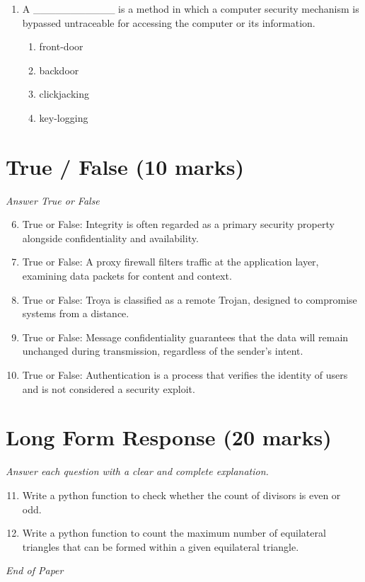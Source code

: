 \documentclass[12pt]{article}
\begin{document}
\begin{enumerate}[label=\arabic*.]
\begin{enumerate}[label=(\alph*)]
    \item Clickjacking
\end{enumerate}
\item A \_\_\_\_\_\_\_\_\_\_\_ is a method in which a computer security mechanism is bypassed untraceable for accessing the computer or its information.
\begin{enumerate}[label=(\alph*)]
    \item front-door
    \item backdoor
    \item clickjacking
    \item key-logging
\end{enumerate}
\end{enumerate}

\section*{True / False (10 marks)}
\textit{Answer True or False}
\begin{enumerate}[label=\arabic*.]
\setcounter{enumi}{5}
\item True or False: Integrity is often regarded as a primary security property alongside confidentiality and availability.
\item True or False: A proxy firewall filters traffic at the application layer, examining data packets for content and context.
\item True or False: Troya is classified as a remote Trojan, designed to compromise systems from a distance.
\item True or False: Message confidentiality guarantees that the data will remain unchanged during transmission, regardless of the sender's intent.
\item True or False: Authentication is a process that verifies the identity of users and is not considered a security exploit.
\end{enumerate}

\section*{Long Form Response (20 marks)}
\textit{Answer each question with a clear and complete explanation.}
\begin{enumerate}[label=\arabic*.]
\setcounter{enumi}{10}
\item Write a python function to check whether the count of divisors is even or odd.
\item Write a python function to count the maximum number of equilateral triangles that can be formed within a given equilateral triangle.
\end{enumerate}

\vfill
\noindent\textit{End of Paper}
\end{document}
